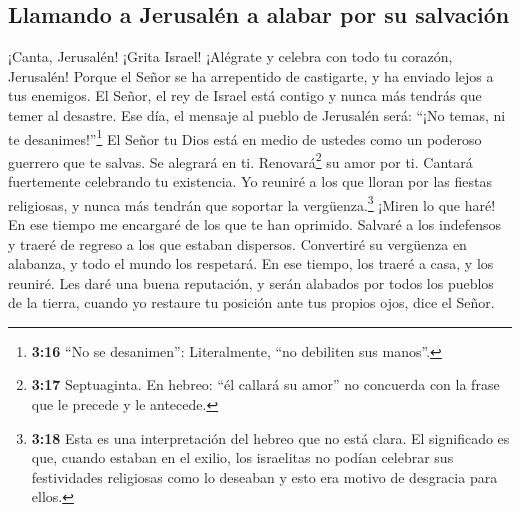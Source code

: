 \hypertarget{llamando-a-jerusaluxe9n-a-alabar-por-su-salvaciuxf3n}{%
\subsection{Llamando a Jerusalén a alabar por su
salvación}\label{llamando-a-jerusaluxe9n-a-alabar-por-su-salvaciuxf3n}}

 ¡Canta, Jerusalén! ¡Grita Israel! ¡Alégrate y celebra
con todo tu corazón, Jerusalén!  Porque el Señor se ha
arrepentido de castigarte, y ha enviado lejos a tus enemigos. El Señor,
el rey de Israel está contigo y nunca más tendrás que temer al desastre.
 Ese día, el mensaje al pueblo de Jerusalén será: ``¡No
temas, ni te desanimes!''\footnote{\textbf{3:16} ``No se desanimen'':
  Literalmente, ``no debiliten sus manos''.}  El Señor tu
Dios está en medio de ustedes como un poderoso guerrero que te salvas.
Se alegrará en ti. Renovará\footnote{\textbf{3:17} Septuaginta. En
  hebreo: ``él callará su amor'' no concuerda con la frase que le
  precede y le antecede.} su amor por ti. Cantará fuertemente celebrando
tu existencia.  Yo reuniré a los que lloran por las
fiestas religiosas, y nunca más tendrán que soportar la
vergüenza.\footnote{\textbf{3:18} Esta es una interpretación del hebreo
  que no está clara. El significado es que, cuando estaban en el exilio,
  los israelitas no podían celebrar sus festividades religiosas como lo
  deseaban y esto era motivo de desgracia para ellos.} 
¡Miren lo que haré! En ese tiempo me encargaré de los que te han
oprimido. Salvaré a los indefensos y traeré de regreso a los que estaban
dispersos. Convertiré su vergüenza en alabanza, y todo el mundo los
respetará.  En ese tiempo, los traeré a casa, y los
reuniré. Les daré una buena reputación, y serán alabados por todos los
pueblos de la tierra, cuando yo restaure tu posición ante tus propios
ojos, dice el Señor.
